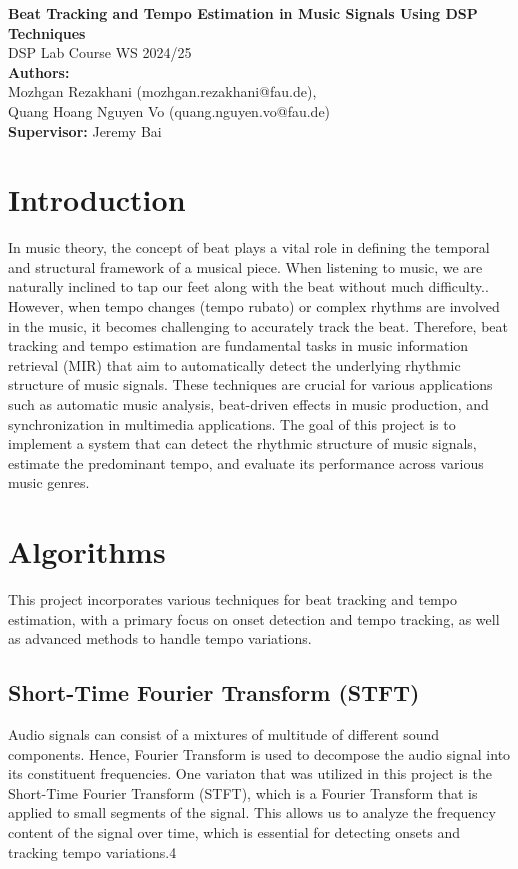 \documentclass[
paper=A4,               %
pagesize=auto,          %
fontsize=12pt,          %
DIV=16,                 %
twoside=false,           %
BCOR=20mm,              %
parskip=false,          %
chapterprefix=true,     %
appendixprefix=true,    %
listof=totoc,           %
bibliography=totoc,     %
headinclude=true,       %
footinclude=false,      %
headsepline=false,       %
footsepline=false,      %
headings=small,         %
numbers=noenddot        %
] {scrbook}
\begin{document}
\begin{center}
    \Huge{\textbf{Beat Tracking and Tempo Estimation in Music Signals Using DSP Techniques}} \\
    \vspace{10pt}
    \large{DSP Lab Course WS 2024/25} \\
    \vspace{5pt}
    \large{\textbf{Authors: \\} 
    Mozhgan Rezakhani (mozhgan.rezakhani@fau.de), \\ Quang Hoang Nguyen Vo (quang.nguyen.vo@fau.de)}\\
    \large{\textbf{Supervisor:} Jeremy Bai}

    
\end{center}

\section*{Introduction}
In music theory, the concept of beat plays a vital role in defining the temporal and structural framework of a musical piece. When listening to music, we are naturally inclined to tap our feet along with the beat without much difficulty.\cite{bookfmp}. However, when tempo changes (tempo rubato) or complex rhythms are involved in the music, it becomes challenging to accurately track the beat. Therefore, beat tracking and tempo estimation are fundamental tasks in music information retrieval (MIR) that aim to automatically detect the underlying rhythmic structure of music signals. These techniques are crucial for various applications such as automatic music analysis, beat-driven effects in music production, and synchronization in multimedia applications\cite{alonso2004tempo}. The goal of this project is to implement a system that can detect the rhythmic structure of music signals, estimate the predominant tempo, and evaluate its performance across various music genres.

\section*{Algorithms}
This project incorporates various techniques for beat tracking and tempo estimation, with a primary focus on onset detection and tempo tracking, as well as advanced methods to handle tempo variations.
\subsection*{Short-Time Fourier Transform (STFT)}
Audio signals can consist of a mixtures of multitude of different sound components.
Hence, Fourier Transform is used to decompose the audio signal into its constituent frequencies. One variaton that was utilized in this project is the Short-Time Fourier Transform (STFT), which is a Fourier Transform that is applied to small segments of the signal. This allows us to analyze the frequency content of the signal over time, which is essential for detecting onsets and tracking tempo variations.4
\end{document}
